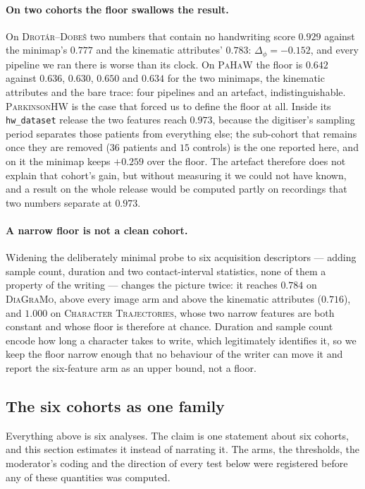 \documentclass[10pt,a4paper]{article}
\begin{document}
\paragraph{On two cohorts the floor swallows the result.} On \textsc{Drot\'ar--Dobe\v{s}} two
numbers that contain no handwriting score $0.929$ against the minimap's $0.777$ and the kinematic
attributes' $0.783$: $\Delta_\phi = -0.152$, and every pipeline we ran there is worse than its
clock. On \textsc{PaHaW} the floor is $0.642$ against $0.636$, $0.630$, $0.650$ and $0.634$ for the
two minimaps, the kinematic attributes and the bare trace: four pipelines and an artefact,
indistinguishable.
\textsc{ParkinsonHW} is the case that forced us to define the floor at all. Inside its
\texttt{hw\_dataset} release the two features reach $0.973$, because the digitiser's sampling period
separates those patients from everything else; the sub-cohort that remains once they are removed
($36$ patients and $15$ controls) is the one reported here, and on it the minimap keeps $+0.259$
over the floor. The artefact therefore does not explain that cohort's gain, but without measuring
it we could not have known, and a result on the whole release would be computed partly on recordings
that two numbers separate at $0.973$.

\paragraph{A narrow floor is not a clean cohort.} Widening the deliberately minimal probe to six
acquisition descriptors --- adding sample count, duration and two contact-interval statistics, none
of them a property of the writing --- changes the picture twice: it reaches $0.784$ on
\textsc{DiaGraMo}, above every image arm and above the kinematic attributes ($0.716$), and $1.000$
on \textsc{Character Trajectories}, whose two narrow features are both constant and whose floor is
therefore at chance. Duration and sample count encode how long a character takes to write, which
legitimately identifies it, so we keep the floor narrow enough that no behaviour of the writer can
move it and report the six-feature arm as an upper bound, not a floor.

\subsection{The six cohorts as one family}
\label{sec:across}

Everything above is six analyses. The claim is one statement about six cohorts, and this section
estimates it instead of narrating it. The arms, the thresholds, the moderator's coding and the
direction of every test below were registered before any of these quantities was computed.
\end{document}
